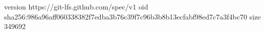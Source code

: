 version https://git-lfs.github.com/spec/v1
oid sha256:986a96aff060338382f7edba3b76c39f7c96b3b8b13ecfabf98ed7c7a3f4bc70
size 349692
